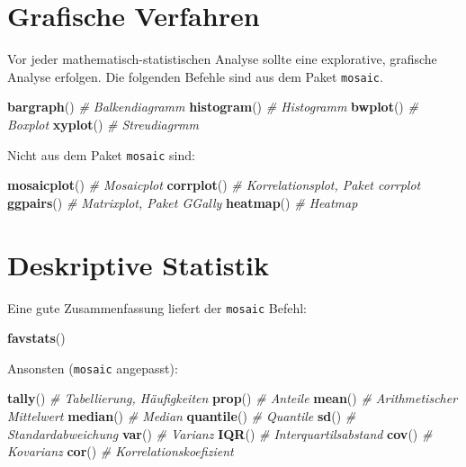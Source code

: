 \documentclass[12pt,ngerman,paper=a4,pagesize,DIV=13]{scrreprt}
\newenvironment{Shaded}{\begin{snugshade}}{\end{snugshade}}
\newcommand{\CommentTok}[1]{\textcolor[rgb]{0.56,0.35,0.01}{\textit{#1}}}
\newcommand{\KeywordTok}[1]{\textcolor[rgb]{0.13,0.29,0.53}{\textbf{#1}}}
\newcommand{\NormalTok}[1]{#1}
\begin{document}
\hypertarget{grafische-verfahren}{%
\section{Grafische Verfahren}\label{grafische-verfahren}}

Vor jeder mathematisch-statistischen Analyse sollte eine explorative,
grafische Analyse erfolgen. Die folgenden Befehle sind aus dem Paket
\texttt{mosaic}.

\begin{Shaded}
\begin{Highlighting}[]
\KeywordTok{bargraph}\NormalTok{() }\CommentTok{# Balkendiagramm}
\KeywordTok{histogram}\NormalTok{() }\CommentTok{# Histogramm}
\KeywordTok{bwplot}\NormalTok{() }\CommentTok{# Boxplot}
\KeywordTok{xyplot}\NormalTok{() }\CommentTok{# Streudiagrmm}
\end{Highlighting}
\end{Shaded}

Nicht aus dem Paket \texttt{mosaic} sind:

\begin{Shaded}
\begin{Highlighting}[]
\KeywordTok{mosaicplot}\NormalTok{() }\CommentTok{# Mosaicplot}
\KeywordTok{corrplot}\NormalTok{() }\CommentTok{# Korrelationsplot, Paket corrplot}
\KeywordTok{ggpairs}\NormalTok{() }\CommentTok{# Matrixplot, Paket GGally}
\KeywordTok{heatmap}\NormalTok{() }\CommentTok{# Heatmap}
\end{Highlighting}
\end{Shaded}

\pagebreak

\hypertarget{deskriptive-statistik}{%
\section{Deskriptive Statistik}\label{deskriptive-statistik}}

Eine gute Zusammenfassung liefert der \texttt{mosaic} Befehl:

\begin{Shaded}
\begin{Highlighting}[]
\KeywordTok{favstats}\NormalTok{()}
\end{Highlighting}
\end{Shaded}

Ansonsten (\texttt{mosaic} angepasst):

\begin{Shaded}
\begin{Highlighting}[]
\KeywordTok{tally}\NormalTok{() }\CommentTok{# Tabellierung, Häufigkeiten }
\KeywordTok{prop}\NormalTok{() }\CommentTok{# Anteile}
\KeywordTok{mean}\NormalTok{() }\CommentTok{# Arithmetischer Mittelwert}
\KeywordTok{median}\NormalTok{() }\CommentTok{# Median}
\KeywordTok{quantile}\NormalTok{() }\CommentTok{# Quantile}
\KeywordTok{sd}\NormalTok{() }\CommentTok{# Standardabweichung}
\KeywordTok{var}\NormalTok{() }\CommentTok{# Varianz}
\KeywordTok{IQR}\NormalTok{() }\CommentTok{# Interquartilsabstand}
\KeywordTok{cov}\NormalTok{() }\CommentTok{# Kovarianz}
\KeywordTok{cor}\NormalTok{() }\CommentTok{# Korrelationskoefizient}
\end{Highlighting}
\end{Shaded}
\end{document}
